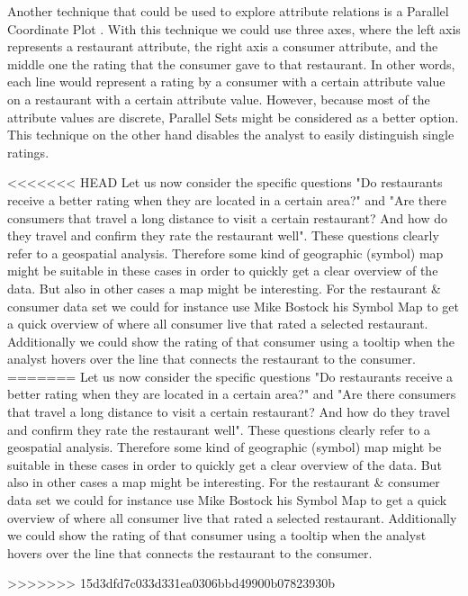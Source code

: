 Another technique that could be used to explore attribute relations is a Parallel Coordinate Plot \cite{D3pcp}. With this technique we could use three axes, where the left axis represents a restaurant attribute, the right axis a consumer attribute, and the middle one the rating that the consumer gave to that restaurant. In other words, each line would represent a rating by a consumer with a certain attribute value on a restaurant with a certain attribute value. However, because most of the attribute values are discrete, Parallel Sets \cite{D3parallelsets} might be considered as a better option. This technique on the other hand disables the analyst to easily distinguish single ratings.

<<<<<<< HEAD
Let us now consider the specific questions "Do restaurants receive a better rating when they are located in a certain area?" and "Are there consumers that travel a long distance to visit a certain restaurant? And how do they travel and confirm they rate the restaurant well". These questions clearly refer to a geospatial analysis. Therefore some kind of geographic (symbol) map \cite{D3map1} might be suitable in these cases in order to quickly get a clear overview of the data. But also in other cases a map might be interesting. For the restaurant \& consumer data set we could for instance use Mike Bostock his Symbol Map to get a quick overview of where all consumer live that rated a selected restaurant. Additionally we could show the rating of that consumer using a tooltip when the analyst hovers over the line that connects the restaurant to the consumer.
=======
Let us now consider the specific questions "Do restaurants receive a better rating when they are located in a certain area?" and "Are there consumers that travel a long distance to visit a certain restaurant? And how do they travel and confirm they rate the restaurant well". These questions clearly refer to a geospatial analysis. Therefore some kind of geographic (symbol) map \cite{D3map1} might be suitable in these cases in order to quickly get a clear overview of the data. But also in other cases a map might be interesting. For the restaurant \& consumer data set we could for instance use Mike Bostock his Symbol Map to get a quick overview of where all consumer live that rated a selected restaurant. Additionally we could show the rating of that consumer using a tooltip when the analyst hovers over the line that connects the restaurant to the consumer.




>>>>>>> 15d3dfd7c033d331ea0306bbd49900b07823930b
